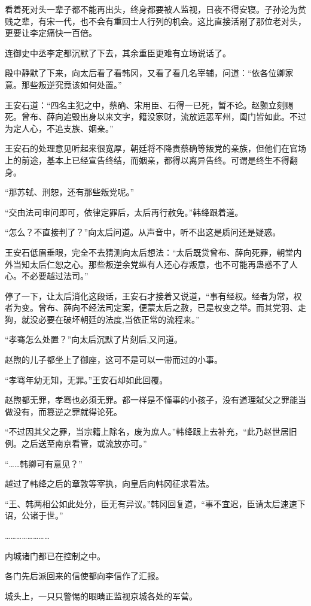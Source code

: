 看着死对头一辈子都不能再出头，终身都要被人监视，日夜不得安寝。子孙沦为贫贱之辈，有宋一代，也不会有重回士人行列的机会。这比直接活剐了那位老对头，更要让李定痛快一百倍。

连御史中丞李定都沉默了下去，其余重臣更难有立场说话了。

殿中静默了下来，向太后看了看韩冈，又看了看几名宰辅，问道：“依各位卿家意。那些叛逆究竟该如何处置。”

王安石道：“四名主犯之中，蔡确、宋用臣、石得一已死，暂不论。赵颢立刻赐死。曾布、薛向追毁出身以来文字，籍没家财，流放远恶军州，阖门皆如此。不过为定人心，不追支族、姻亲。”

王安石的处理意见听起来很宽厚，朝廷将不降责蔡确等叛党的亲族，但他们在官场上的前途，基本上已经宣告终结，而姻亲，都得以离异告终。可谓是终生不得翻身。

“那苏轼、刑恕，还有那些叛党呢。”

“交由法司审问即可，依律定罪后，太后再行赦免。”韩绛跟着道。

“怎么？不直接判了？”向太后问道。从声音中，听不出这是质问还是疑惑。

王安石低眉垂眼，完全不去猜测向太后想法：“太后既贷曾布、薛向死罪，朝堂内外当知太后仁恕之心。那些叛逆余党纵有人还心存叛意，也不可能再蛊惑不了人心。不必要越过法司。”

停了一下，让太后消化这段话，王安石才接着又说道，“事有经权。经者为常，权者为变。曾布、薛向不经法司定案，便蒙太后之赦，已是权变之举。而其党羽、走狗，就没必要在破坏朝廷的法度,当依正常的流程来。”

“孝骞怎么处置？”向太后沉默了片刻后,又问道。

赵煦的儿子都坐上了御座，这可不是可以一带而过的小事。

“孝骞年幼无知，无罪。”王安石却如此回覆。

赵煦都无罪，孝骞也必须无罪。都一样是不懂事的小孩子，没有道理弑父之罪能当做没有，而篡逆之罪就得论死。

“不过因其父之罪，当宗籍上除名，废为庶人。”韩绛跟上去补充，“此乃赵世居旧例。之后送至南京看管，或流放亦可。”

“……韩卿可有意见？”

越过了韩绛之后的章敦等宰执，向皇后向韩冈征求看法。

“王、韩两相公如此处分，臣无有异议。”韩冈回复道，“事不宜迟，臣请太后速速下诏，公诸于世。”

……………………

内城诸门都已在控制之中。

各门先后派回来的信使都向李信作了汇报。

城头上，一只只警惕的眼睛正监视京城各处的军营。

